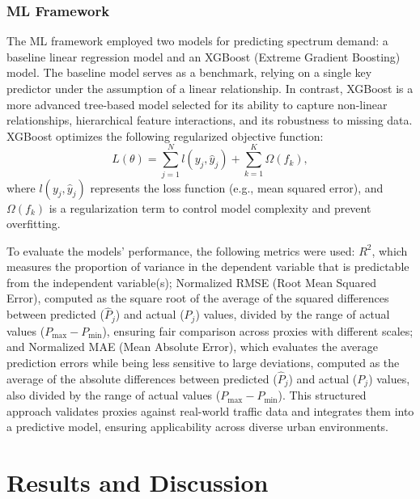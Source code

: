 \documentclass[conference]{IEEEtran}
\begin{document}
\subsubsection{ML Framework}
The ML framework employed two models for predicting spectrum demand: a baseline linear regression model and an XGBoost (Extreme Gradient Boosting) model. The baseline model serves as a benchmark, relying on a single key predictor under the assumption of a linear relationship. In contrast, XGBoost is a more advanced tree-based model selected for its ability to capture non-linear relationships, hierarchical feature interactions, and its robustness to missing data. XGBoost optimizes the following regularized objective function:
\begin{equation}
L(\theta) = \sum_{j=1}^{N} l(y_j, \hat{y}_j) + \sum_{k=1}^{K} \Omega(f_k),
\end{equation}
where \( l(y_j, \hat{y}_j) \) represents the loss function (e.g., mean squared error), and \( \Omega(f_k) \) is a regularization term to control model complexity and prevent overfitting.

To evaluate the models' performance, the following metrics were used: \(R^2\), which measures the proportion of variance in the dependent variable that is predictable from the independent variable(s); Normalized RMSE (Root Mean Squared Error), computed as the square root of the average of the squared differences between predicted (\( \hat{P}_j \)) and actual (\( P_j \)) values, divided by the range of actual values (\( P_{\max} - P_{\min} \)), ensuring fair comparison across proxies with different scales; and Normalized MAE (Mean Absolute Error), which evaluates the average prediction errors while being less sensitive to large deviations, computed as the average of the absolute differences between predicted (\( \hat{P}_j \)) and actual (\( P_j \)) values, also divided by the range of actual values (\( P_{\max} - P_{\min} \)).
This structured approach validates proxies against real-world traffic data and integrates them into a predictive model, ensuring applicability across diverse urban environments.




\section{Results and Discussion}\label{sec:results_discussion}
\end{document}
